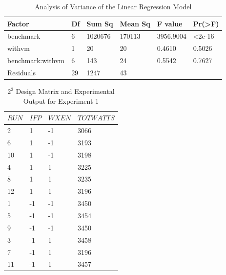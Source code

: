 \documentclass[preprint]{sigplanconf}
\begin{document}
 \begin{table}
   \centering
   \begin{tabular}{l|l|l|l|l|l}
     Factor&           Df&  Sum Sq& Mean Sq&   F value& Pr(>F)    \\
     \hline
     benchmark&         6& 1020676&  170113& 3956.9004& <2e-16\\
     withvm&           1&      20&      20&    0.4610& 0.5026  \\  
     benchmark:withvm& 6&     143&      24&    0.5542& 0.7627  \\
     Residuals&        29&    1247&      43&          &         \\
  \end{tabular}
  \caption{Analysis of Variance of the Linear Regression Model}
  \label{tab:SingleModelAnova}
\end{table}
\clearpage
\begin{table}
  \centering
  \begin{tabular}{l|l|l|l}
    $RUN$&$IFP$&$WXEN$&$TOTWATTS$ \\
    \hline
    2&1&-1&3066\\
    6&1&-1&3193\\
    10&1&-1&3198\\
    4&1&1&3225\\
    8&1&1&3235\\
    12&1&1&3196\\
    1&-1&-1&3450\\
    5&-1&-1&3454\\
    9&-1&-1&3450\\
    3&-1&1&3458\\
    7&-1&1&3196\\
    11&-1&1&3457\\
  \end{tabular}
  \caption{\(2^{2}\) Design Matrix and Experimental Output for Experiment 1}
  \label{tab:ExperimentDesign1}
\end{table}
\end{document}
